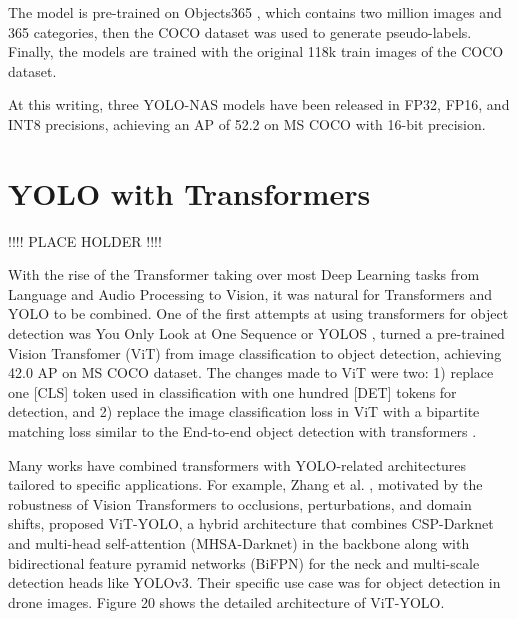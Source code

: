 \documentclass{article}
\begin{document}
The model is pre-trained on Objects365 \cite{shao2019objects365}, which contains two million images and 365 categories, then the COCO dataset was used to generate pseudo-labels. Finally, the models are trained with the original 118k train images of the COCO dataset.

At this writing, three YOLO-NAS models have been released in FP32, FP16, and INT8 precisions, achieving an AP of 52.2 on MS COCO with 16-bit precision.




\section{YOLO with Transformers}

!!!! PLACE HOLDER !!!!


With the rise of the Transformer \cite{vaswani2017attention} taking over most Deep Learning tasks from Language and Audio Processing to Vision, it was natural for Transformers and YOLO to be combined. One of the first attempts at using transformers for object detection was You Only Look at One Sequence or YOLOS \cite{fang2021you}, turned a pre-trained Vision Transfomer (ViT) \cite{alexey2020image} from image classification to object detection, achieving 42.0 AP on MS COCO dataset. The changes made to ViT were two: 1) replace one [CLS] token used in classification with one hundred [DET] tokens for detection, and 2) replace the image classification loss in ViT with a bipartite matching loss similar to the End-to-end object detection with transformers \cite{carion2020end}.

Many works have combined transformers with YOLO-related architectures tailored to specific applications. For example, Zhang et al. \cite{zhang2021vit}, motivated by the robustness of Vision Transformers to occlusions, perturbations, and domain shifts, proposed ViT-YOLO, a hybrid architecture that combines CSP-Darknet \cite{bochkovskiy2020yolov4} and multi-head self-attention (MHSA-Darknet) in the backbone along with bidirectional feature pyramid networks (BiFPN) \cite{9156454} for the neck and multi-scale detection heads like YOLOv3. Their specific use case was for object detection in drone images. Figure 20 shows the detailed architecture of ViT-YOLO.
\end{document}
